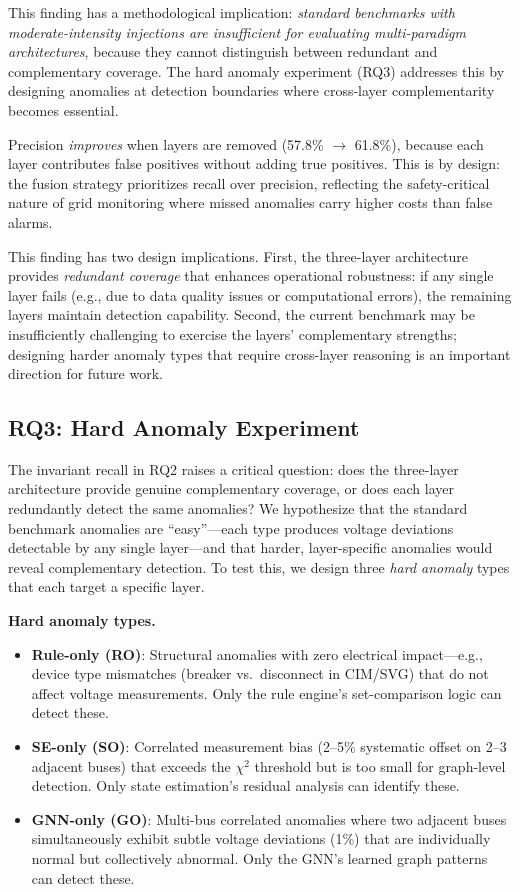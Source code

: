 \documentclass[research]{fcs}
\begin{document}
This finding has a methodological implication: \emph{standard benchmarks with moderate-intensity injections are insufficient for evaluating multi-paradigm architectures}, because they cannot distinguish between redundant and complementary coverage. The hard anomaly experiment (RQ3) addresses this by designing anomalies at detection boundaries where cross-layer complementarity becomes essential.

Precision \emph{improves} when layers are removed (57.8\% $\rightarrow$ 61.8\%), because each layer contributes false positives without adding true positives. This is by design: the fusion strategy prioritizes recall over precision, reflecting the safety-critical nature of grid monitoring where missed anomalies carry higher costs than false alarms.

This finding has two design implications. First, the three-layer architecture provides \emph{redundant coverage} that enhances operational robustness: if any single layer fails (e.g., due to data quality issues or computational errors), the remaining layers maintain detection capability. Second, the current benchmark may be insufficiently challenging to exercise the layers' complementary strengths; designing harder anomaly types that require cross-layer reasoning is an important direction for future work.

\subsection{RQ3: Hard Anomaly Experiment}

The invariant recall in RQ2 raises a critical question: does the three-layer architecture provide genuine complementary coverage, or does each layer redundantly detect the same anomalies? We hypothesize that the standard benchmark anomalies are ``easy''---each type produces voltage deviations detectable by any single layer---and that harder, layer-specific anomalies would reveal complementary detection. To test this, we design three \emph{hard anomaly} types that each target a specific layer.

\textbf{Hard anomaly types.}
\begin{itemize}
\item \textbf{Rule-only (RO)}: Structural anomalies with zero electrical impact---e.g., device type mismatches (breaker vs.\ disconnect in CIM/SVG) that do not affect voltage measurements. Only the rule engine’s set-comparison logic can detect these.
\item \textbf{SE-only (SO)}: Correlated measurement bias (2--5\% systematic offset on 2--3 adjacent buses) that exceeds the $\chi^2$ threshold but is too small for graph-level detection. Only state estimation's residual analysis can identify these.
\item \textbf{GNN-only (GO)}: Multi-bus correlated anomalies where two adjacent buses simultaneously exhibit subtle voltage deviations (1\%) that are individually normal but collectively abnormal. Only the GNN's learned graph patterns can detect these.
\end{itemize}
\end{document}
